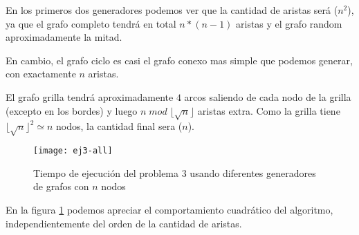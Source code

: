 En los primeros dos generadores podemos ver que la cantidad de aristas será \bigo($n^2$), ya que el grafo completo tendrá en total $n * (n-1)$ aristas y el grafo random aproximadamente la mitad.

En cambio, el grafo ciclo es casi el grafo conexo mas simple que podemos generar, con exactamente $n$ aristas.

El grafo grilla tendrá aproximadamente $4$ arcos saliendo de cada nodo de la grilla (excepto en los bordes) y luego $n \; mod \; \lfloor \sqrt{n} \rfloor$ aristas extra. Como la grilla tiene $\lfloor \sqrt{n} \rfloor^2 \simeq n$ nodos, la cantidad final sera \bigo($n$).

    \begin{figure}[H]
    	\centering
    	\texttt{[image: ej3-all]}
    	\caption{Tiempo de ejecución del problema 3 usando diferentes generadores de grafos con $n$ nodos}
    	\label{fig:ej3-all}
    \end{figure}

En la figura \ref{fig:ej3-all} podemos apreciar el comportamiento cuadrático del algoritmo, independientemente del orden de la cantidad de aristas.

